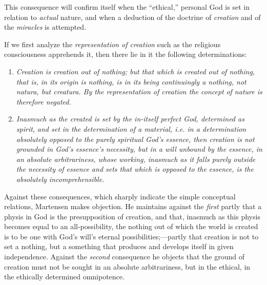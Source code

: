 \documentclass[12pt,a4paper]{book}
\begin{document}
This consequence will confirm itself when the ``ethical,'' personal God is set in
relation to \emph{actual} nature, and when a deduction of the doctrine of \emph{creation} and of the
\emph{miracles} is attempted.

If we first analyze the \emph{representation of creation} such as the religious consciousness
apprehends it, then there lie in it the following determinations:

\begin{enumerate}[label=\arabic*)]
\item \emph{Creation is creation out of nothing; but that which is created out of nothing,}
  \emph{that is, in its origin is nothing, is in its being continuingly a nothing, not}
  \emph{\textit{natura}, but \textit{creatura}. By the representation of creation the concept}
  \emph{of nature is therefore negated.}
\item \emph{Inasmuch as the created is set by the in-itself perfect God, determined as spirit,}
  \emph{and set in the determination of a material, i.e. in a determination absolutely opposed}
  \emph{to the purely spiritual God's essence, then creation is not grounded in God's essence's}
  \emph{necessity, but in a will unbound by the essence, in an absolute arbitrariness, whose}
  \emph{working, inasmuch as it falls purely outside the necessity of essence and sets that}
  \emph{which is opposed to the essence, is the absolutely incomprehensible.}
\end{enumerate}

Against these consequences, which sharply indicate the simple conceptual relations,
Martensen makes objection. He maintains against the \emph{first} partly that a physis in God is
the presupposition of creation, and that, inasmuch as this physis becomes equal to an
all-possibility, the nothing out of which the world is created is to be one with God's
will's eternal possibilities;---partly that creation is not to set a nothing, but a
something that produces and develops itself in given independence. Against the \emph{second}
consequence he objects that the ground of creation must not be sought in an absolute
arbitrariness, but in the ethical, in the ethically determined omnipotence.
\end{document}
